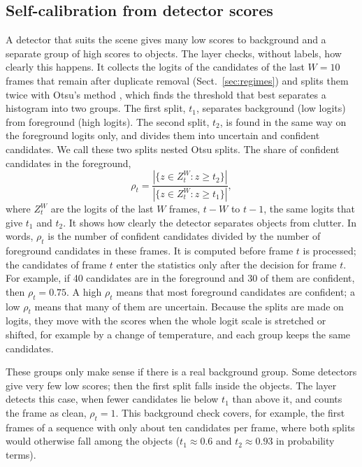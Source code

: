\documentclass[pdflatex,sn-mathphys-num,iicol]{sn-jnl}
\begin{document}
\subsection{Self-calibration from detector scores}\label{sec:calib}
A detector that suits the scene gives many low scores to background and a
separate group of high scores to objects. The layer checks, without labels,
how clearly this happens. It collects the logits of the candidates of the
last $W=10$ frames that remain after duplicate removal
(Sect.~\ref{sec:regimes}) and splits them twice with Otsu's method \cite{otsu1979},
which finds the threshold that best separates a histogram into two groups.
The first split, $t_1$, separates background (low logits) from foreground
(high logits). The second split, $t_2$, is found in the same way on the
foreground logits only, and divides them into uncertain and confident
candidates. We call these two splits nested Otsu splits.
The share of confident candidates in the foreground,
\begin{equation}
\rho_t=\frac{\left|\{z\in Z_t^W: z\ge t_2\}\right|}{\left|\{z\in Z_t^W: z\ge t_1\}\right|},
\label{eq:rho}
\end{equation}
where $Z_t^W$ are the logits of the last $W$ frames, $t-W$ to $t-1$, the same
logits that give $t_1$ and $t_2$. It shows how clearly the detector separates
objects from clutter. In words, $\rho_t$ is the number of confident candidates
divided by the number of foreground candidates in these frames. It is computed
before frame $t$ is processed; the candidates of frame $t$ enter the
statistics only after the decision for frame $t$. For example, if 40 candidates are in the foreground
and 30 of them are confident, then $\rho_t=0.75$. A high $\rho_t$ means that most foreground candidates are confident; a low $\rho_t$
means that many of them are uncertain. Because the splits are made on
logits, they move with the scores when the whole logit scale is stretched or
shifted, for example by a change of temperature, and each group keeps the
same candidates.

These groups only make sense if there is a real background group. Some
detectors give very few low scores; then the first split falls inside the
objects. The layer detects this case, when fewer candidates lie below $t_1$
than above it, and counts the frame as clean, $\rho_t=1$. This background
check covers, for example, the first frames of a sequence with only about
ten candidates per frame, where both splits would otherwise fall among the
objects ($t_1\approx0.6$ and $t_2\approx0.93$ in probability terms).
\end{document}
